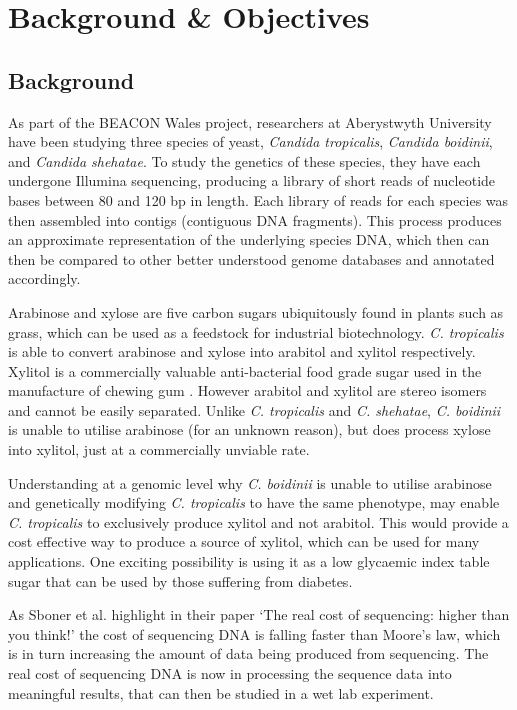 \chapter{Background \& Objectives}

\section{Background}
As part of the BEACON Wales\cite{beacon} project, researchers at Aberystwyth University have been studying three species of yeast, \textit{Candida tropicalis}, \textit{Candida boidinii}, and \textit{Candida shehatae}. To study the genetics of these species, they have each undergone Illumina sequencing, producing a library of short reads of nucleotide bases between 80 and 120 bp in length. Each library of reads for each species was then assembled into contigs (contiguous DNA fragments). This process produces an approximate representation of the underlying species DNA, which then can then be compared to other better understood genome databases and annotated accordingly.

Arabinose and xylose are five carbon sugars ubiquitously found in plants such as grass, which can be used as a feedstock for industrial biotechnology. \textit{C. tropicalis} is able to convert arabinose and xylose into arabitol and xylitol respectively. Xylitol is a commercially valuable anti-bacterial food grade sugar used in the manufacture of chewing gum \cite{xylitol}. However arabitol and xylitol are stereo isomers and cannot be easily separated. Unlike \textit{C. tropicalis} and \textit{C. shehatae},  \textit{C. boidinii} is unable to utilise arabinose (for an unknown reason), but does process xylose into xylitol, just at a commercially unviable rate. 

Understanding at a genomic level why \textit{C. boidinii} is unable to utilise arabinose and genetically modifying \textit{C. tropicalis} to have the same phenotype, may enable \textit{C. tropicalis} to exclusively produce xylitol and not arabitol. This would provide a cost effective way to produce a source of xylitol, which can be used for many applications. One exciting possibility is using it as a low glycaemic index table sugar that can be used by those suffering from diabetes.

As Sboner et al. highlight in their paper `The real cost of sequencing: higher than you think!'\cite{sequencingcost} the cost of sequencing DNA is falling faster than Moore's law, which is in turn increasing the amount of data being produced from sequencing. The real cost of sequencing DNA is now in processing the sequence data into meaningful results, that can then be studied in a wet lab experiment. 

